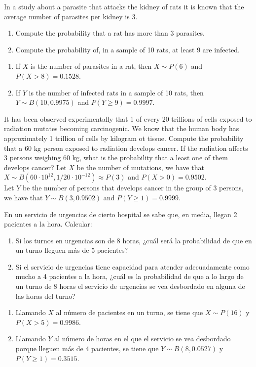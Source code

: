 {In a study about a parasite that attacks the kidney of rats it is known that the average number of parasites per
kidney is 3. 
\begin{enumerate}
\item Compute the probability that a rat has more than 3 parasites.
\item Compute the probability of, in a sample of 10 rats, at least 9 are infected. 
\end{enumerate}
}
{
\begin{enumerate}
\item If $X$ is the number of parasites in a rat, then $X\sim P(6)$ and $P(X>8)=0.1528$.
\item If $Y$ is the number of infected rats in a sample of 10 rats, then $Y\sim B(10,0.9975)$ and $P(Y\geq
9)=0.9997$.
\end{enumerate}
}
{}


{It has been observed experimentally that 1 of every 20 trillions of cells exposed to radiation mutates becoming
carcinogenic. 
We know that the human body has approximately 1 trillion of cells by kilogram ot tissue. 
Compute the probability that a 60 kg person exposed to radiation develops cancer.
If the radiation affects 3 persons weighing 60 kg, what is the probability that a least one of them develops cancer? }
{Let $X$ be the number of mutations, we have that $X\sim B(60\cdot 10^{12},1/20\cdot 10^{-12})\approx P(3)$ and $P(X>0)=0.9502$.\\ 
Let $Y$ be the number of persons that develops cancer in the group of 3 persons, we have that $Y\sim B(3,0.9502)$ and $P(Y\geq 1)=0.9999$.
}
{}


{En un servicio de urgencias de cierto hospital se sabe que, en media, llegan 2 pacientes a la hora.
Calcular:
\begin{enumerate}
\item Si los turnos en urgencias son de 8 horas, ¿cuál será la probabilidad de que en un turno lleguen más de 5 pacientes?
\item Si el servicio de urgencias tiene capacidad para atender adecuadamente como mucho a 4 pacientes a la hora, ¿cuál
es la probabilidad de que a lo largo de un turno de 8 horas el servicio de urgencias se vea desbordado en alguna de las
horas del turno?
\end{enumerate}
}
{
\begin{enumerate}
\item Llamando $X$ al número de pacientes en un turno, se tiene que $X\sim P(16)$ y $P(X>5)=0.9986$.
\item Llamando $Y$ al número de horas en el que el servicio se vea desbordado porque lleguen más de 4 pacientes, se
tiene que $Y\sim B(8,0.0527)$ y $P(Y\geq 1)=0.3515$.
\end{enumerate}
}
{}


